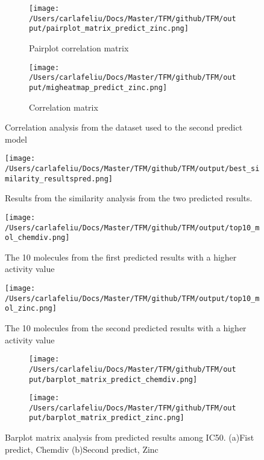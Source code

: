 \documentclass[final,times,twocolumn,article]{elsarticle}
\begin{document}
 \begin{figure}[h]
    \begin{subfigure}{0.5\textwidth}
        \texttt{[image: /Users/carlafeliu/Docs/Master/TFM/github/TFM/output/pairplot\_matrix\_predict\_zinc.png]} 
        \caption{Pairplot correlation matrix}
    \end{subfigure}
    \begin{subfigure}{0.5\textwidth}
        \texttt{[image: /Users/carlafeliu/Docs/Master/TFM/github/TFM/output/migheatmap\_predict\_zinc.png]}
        \caption{Correlation matrix}
    \end{subfigure}
    
    \caption{Correlation analysis from the dataset used to the second predict model}
    \label{Figure11}
\end{figure}

 \begin{figure}[h]
    \centering 
     \texttt{[image: /Users/carlafeliu/Docs/Master/TFM/github/TFM/output/best\_similarity\_resultspred.png]}	
     \caption{Results from the similarity analysis from the two predicted results.} 
     \label{Figure12}
 \end{figure}

 \begin{figure*}[h]
    \centering 
     \texttt{[image: /Users/carlafeliu/Docs/Master/TFM/github/TFM/output/top10\_mol\_chemdiv.png]}	
     \caption{The 10 molecules from the first predicted results with a higher activity value} 
     \label{Figure13*}
 \end{figure*}

 \begin{figure*}[h]
    \centering 
     \texttt{[image: /Users/carlafeliu/Docs/Master/TFM/github/TFM/output/top10\_mol\_zinc.png]}	
     \caption{The 10 molecules from the second predicted results with a higher activity value} 
     \label{Figure14}
 \end{figure*}

 \begin{figure}[h]
    \begin{subfigure}{0.5\textwidth}
        \texttt{[image: /Users/carlafeliu/Docs/Master/TFM/github/TFM/output/barplot\_matrix\_predict\_chemdiv.png]} 
        \caption{}
    \end{subfigure}
    \begin{subfigure}{0.5\textwidth}
        \texttt{[image: /Users/carlafeliu/Docs/Master/TFM/github/TFM/output/barplot\_matrix\_predict\_zinc.png]}
        \caption{}
    \end{subfigure}
    
    \caption{Barplot matrix analysis from predicted results among IC50. (a)Fist predict, Chemdiv (b)Second predict, Zinc }
    \label{Figure15}
\end{figure}
\end{document}
